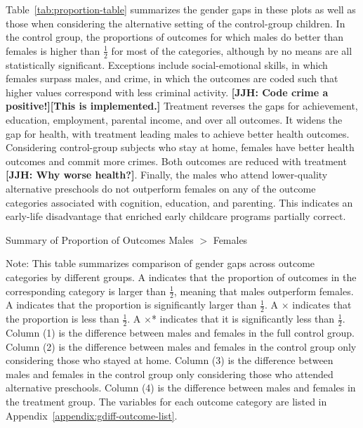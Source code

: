 Table~\ref{tab:proportion-table} summarizes the gender gaps in these plots as well as those when considering the alternative setting of the control-group children. In the control group, the proportions of outcomes for which males do better than females is higher than $\frac{1}{2}$ for most of the categories, although by no means are all statistically significant. Exceptions include social-emotional skills, in which females surpass males, and crime, in which the outcomes are coded such that higher values correspond with less criminal activity. \textbf{[JJH: Code crime a positive!][This is implemented.]} Treatment reverses the gaps for achievement, education, employment, parental income, and over all outcomes. It widens the gap for health, with treatment leading males to achieve better health outcomes. Considering control-group subjects who stay at home, females have better health outcomes and commit more crimes. Both outcomes are reduced with treatment \textbf{[JJH: Why worse health?]}. Finally, the males who attend lower-quality alternative preschools do not outperform females on any of the outcome categories associated with cognition, education, and parenting. This indicates an early-life disadvantage that enriched early childcare programs partially correct.

\begin{table}[H]
\centering
\caption{Summary of Proportion of Outcomes Males $>$ Females}
\label{tab:proportion-table}
\begin{threeparttable}

\begin{tablenotes}
\footnotesize
\item Note: This table summarizes comparison of gender gaps across outcome categories by different groups. A \checkmark indicates that the proportion of outcomes in the corresponding category is larger than $\frac{1}{2}$, meaning that males outperform females. A \checkmark* indicates that the proportion is significantly larger than $\frac{1}{2}$. A $\times$ indicates that the proportion is less than $\frac{1}{2}$. A $\times$* indicates that it is significantly less than $\frac{1}{2}$. Column (1) is the difference between males and females in the full control group.  Column (2) is the difference between males and females in the control group only considering those who stayed at home. Column (3) is the difference between males and females in the control group only considering those who attended alternative preschools. Column (4) is the difference between males and females in the treatment group. The variables for each outcome category are listed in Appendix~\ref{appendix:gdiff-outcome-list}.
\end{tablenotes}
\end{threeparttable}
\end{table}

